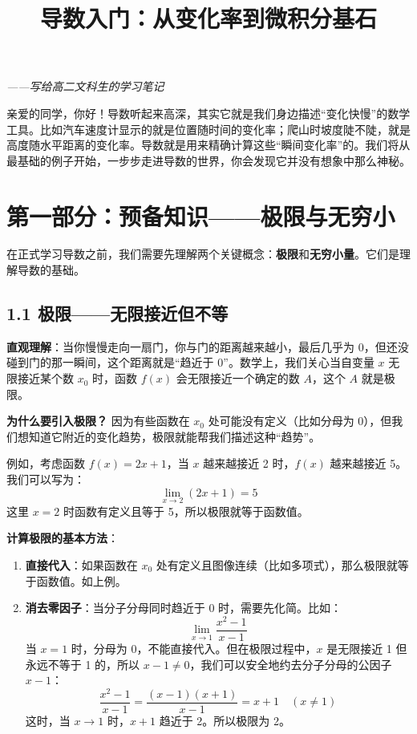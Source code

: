 \documentclass[10pt]{article}
\title{导数入门：从变化率到微积分基石}
\author{}
\date{}
\begin{document}
\maketitle

\begin{center}
\textit{——写给高二文科生的学习笔记}
\end{center}

亲爱的同学，你好！导数听起来高深，其实它就是我们身边描述“变化快慢”的数学工具。比如汽车速度计显示的就是位置随时间的变化率；爬山时坡度陡不陡，就是高度随水平距离的变化率。导数就是用来精确计算这些“瞬间变化率”的。我们将从最基础的例子开始，一步步走进导数的世界，你会发现它并没有想象中那么神秘。

\section*{第一部分：预备知识——极限与无穷小}

在正式学习导数之前，我们需要先理解两个关键概念：\textbf{极限}和\textbf{无穷小量}。它们是理解导数的基础。

\subsection*{1.1 极限——无限接近但不等}

\textbf{直观理解}：当你慢慢走向一扇门，你与门的距离越来越小，最后几乎为 0，但还没碰到门的那一瞬间，这个距离就是“趋近于 0”。数学上，我们关心当自变量 $x$ 无限接近某个数 $x_0$ 时，函数 $f(x)$ 会无限接近一个确定的数 $A$，这个 $A$ 就是极限。

\textbf{为什么要引入极限？} 因为有些函数在 $x_0$ 处可能没有定义（比如分母为 0），但我们想知道它附近的变化趋势，极限就能帮我们描述这种“趋势”。

例如，考虑函数 $f(x)=2x+1$，当 $x$ 越来越接近 2 时，$f(x)$ 越来越接近 5。我们可以写为：
\[
\lim_{x \to 2} (2x+1) = 5
\]
这里 $x=2$ 时函数有定义且等于 5，所以极限就等于函数值。

\textbf{计算极限的基本方法}：
\begin{enumerate}
    \item \textbf{直接代入}：如果函数在 $x_0$ 处有定义且图像连续（比如多项式），那么极限就等于函数值。如上例。
    \item \textbf{消去零因子}：当分子分母同时趋近于 0 时，需要先化简。比如：
    \[
    \lim_{x \to 1} \frac{x^2-1}{x-1}
    \]
    当 $x=1$ 时，分母为 0，不能直接代入。但在极限过程中，$x$ 是无限接近 1 但永远不等于 1 的，所以 $x-1 \neq 0$，我们可以安全地约去分子分母的公因子 $x-1$：
    \[
    \frac{x^2-1}{x-1} = \frac{(x-1)(x+1)}{x-1} = x+1 \quad (x \neq 1)
    \]
    这时，当 $x \to 1$ 时，$x+1$ 趋近于 2。所以极限为 2。
\end{enumerate}
\end{document}
